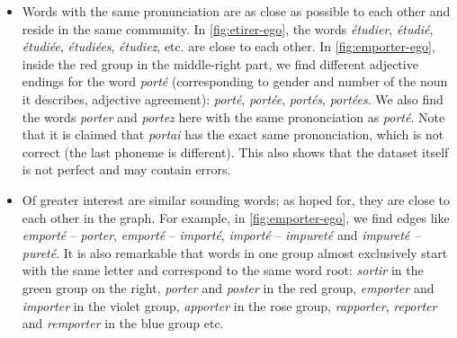 \begin{itemize}[leftmargin=0cm]
    \item Words with the same pronunciation are as close as possible to each other and reside in the same community. In \autoref{fig:etirer-ego}, the words \textit{étudier}, \textit{étudié}, \textit{étudiée}, \textit{étudiées}, \textit{étudiez}, etc. are close to each other. In \autoref{fig:emporter-ego}, inside the red group in the middle-right part, we find different adjective endings for the word \textit{porté} (corresponding to gender and number of the noun it describes, \ie adjective agreement): \textit{porté}, \textit{portée}, \textit{portés}, \textit{portées}. We also find the words \textit{porter} and \textit{portez} here with the same prononciation as \textit{porté}. Note that it is claimed that \textit{portai} has the exact same prononciation, which is not correct (the last phoneme is different). This also shows that the dataset itself is not perfect and may contain errors. 
    
    \item Of greater interest are similar sounding words; as hoped for, they are close to each other in the graph. For example, in \autoref{fig:emporter-ego}, we find edges like \textit{emporté} -- \textit{porter}, \textit{emporté} -- \textit{importé}, \textit{importé} -- \textit{impureté} and \textit{impureté -- pureté}. It is also remarkable that words in one group almost exclusively start with the same letter and correspond to the same word root: \textit{sortir} in the green group on the right, \textit{porter} and \textit{poster} in the red group, \textit{emporter} and \textit{importer} in the violet group, \textit{apporter} in the rose group, \textit{rapporter}, \textit{reporter} and \textit{remporter} in the blue group etc.
    

\end{itemize}
